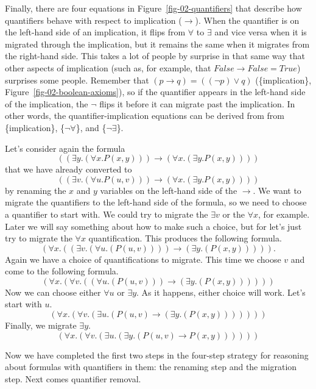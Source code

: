{Finally, there are four equations in Figure~\ref{fig-02-quantifiers} that
describe how quantifiers behave with respect to implication ($\rightarrow$).
When the quantifier is on the left-hand side of an implication, it flips from
$\forall$ to $\exists$ and vice versa when it is migrated through the implication,
but it remains the same when it migrates from the right-hand side.
This takes a lot of people by surprise in that same way that
other aspects of implication (such as, for example, that $False \rightarrow False = True$)
surprises some people.
Remember that $(p \rightarrow q) = ((\neg p) \vee q)$
(\{implication\}, Figure~\ref{fig-02-boolean-axioms}),
so if the quantifier appears in the left-hand side of
the implication, the $\neg$ flips it before it can migrate past the implication.
In other words, the quantifier-implication equations can be derived
from from \{implication\}, \{$\neg\forall$\}, and \{$\neg\exists$\}.

Let's consider again the formula
$$((\exists y.(\forall x.P(x, y))) \rightarrow (\forall x.(\exists y.P(x, y))))$$
that we have already converted to
$$((\exists v.(\forall u.P(u, v))) \rightarrow (\forall x.(\exists y.P(x, y))))$$
by renaming the $x$ and $y$ variables on the left-hand side of the $\rightarrow$.
We want to migrate the quantifiers to the left-hand side of the formula,
so we need to choose a quantifier to start with.
We could try to migrate the $\exists v$ or the $\forall x$, for example.
Later we will say something about how to make such a choice,
but for let's just try to migrate the $\forall x$ quantification.
This produces the following formula.
$$(\forall x.((\exists v.(\forall u.(P(u, v)))) \rightarrow (\exists y.(P(x, y))))).$$
Again we have a choice of quantifications to migrate.
This time we choose $v$ and come to the following formula.
$$(\forall x.(\forall v.((\forall u.(P(u, v))) \rightarrow (\exists y.(P(x, y))))))$$
Now we can choose either $\forall u$ or $\exists y$.
As it happens, either choice will work.
Let's start with $u$.
$$(\forall x.(\forall v.(\exists u.(P(u, v) \rightarrow (\exists y.(P(x, y)))))))$$
Finally, we migrate $\exists y$.
$$(\forall x.(\forall v.(\exists u.(\exists y.(P(u, v) \rightarrow P(x, y))))))$$

Now we have completed the first two steps in the
four-step strategy for reasoning about formulas with quantifiers in them:
the renaming step and the migration step.
Next comes quantifier removal.

}
